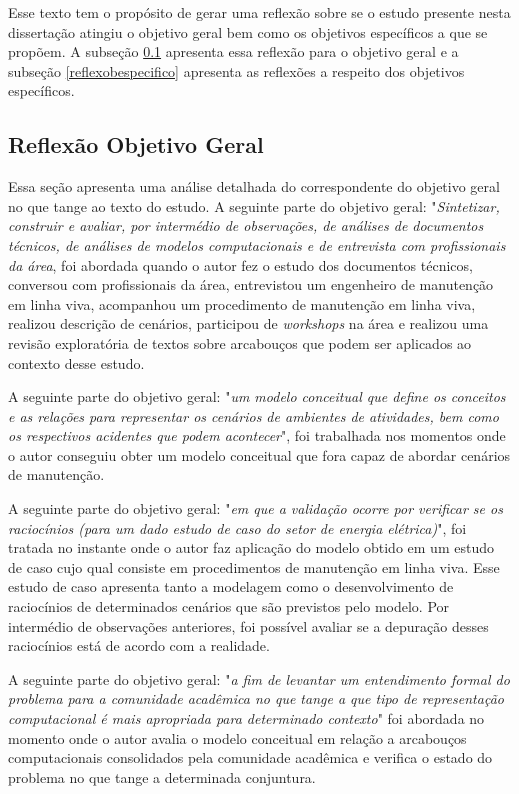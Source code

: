 Esse texto tem o propósito de gerar uma reflexão sobre se o estudo presente nesta dissertação atingiu o objetivo geral bem como os objetivos específicos a que se propõem. A subseção \ref{reflexobgeral} apresenta essa reflexão para o objetivo geral e a subseção \ref{reflexobespecifico} apresenta as reflexões a respeito dos objetivos específicos.

\subsection{Reflexão Objetivo Geral}\label{reflexobgeral}

Essa seção apresenta uma análise detalhada do correspondente do objetivo geral no que tange ao texto do estudo. A seguinte parte do objetivo geral: "\textit{Sintetizar, construir e avaliar, por intermédio de observações, de análises de documentos técnicos, de análises de modelos computacionais e de entrevista com profissionais da área}, foi abordada quando o autor fez o estudo dos documentos técnicos, conversou com profissionais da área, entrevistou um engenheiro de manutenção em linha viva, acompanhou um procedimento de manutenção em linha viva, realizou descrição de cenários, participou de \textit{workshops} na área e realizou uma revisão exploratória de textos sobre arcabouços que podem ser aplicados ao contexto desse estudo. 

A seguinte parte do objetivo geral: "\textit{um modelo conceitual que define os conceitos e as relações para representar os cenários de ambientes de atividades, bem como os respectivos acidentes que podem acontecer}", foi trabalhada nos momentos onde o autor conseguiu obter um modelo conceitual que fora capaz de abordar cenários de manutenção. 

A seguinte parte do objetivo geral: "\textit{em que a validação ocorre por verificar se os raciocínios (para um dado estudo de caso do setor de energia elétrica)}", foi tratada no instante onde o autor faz aplicação do modelo obtido em um estudo de caso cujo qual consiste em procedimentos de manutenção em linha viva. Esse estudo de caso apresenta tanto a modelagem como o desenvolvimento de raciocínios de determinados cenários que são previstos pelo modelo. Por intermédio de observações anteriores, foi possível avaliar se a depuração desses raciocínios está de acordo com a realidade.  

A seguinte parte do objetivo geral: "\textit{a fim de levantar um entendimento formal do problema para a comunidade acadêmica no que tange a que tipo de representação computacional é mais apropriada para determinado contexto}" foi abordada no momento onde o autor avalia o modelo conceitual em relação a arcabouços computacionais consolidados pela comunidade acadêmica e verifica o estado do problema no que tange a determinada conjuntura. 


